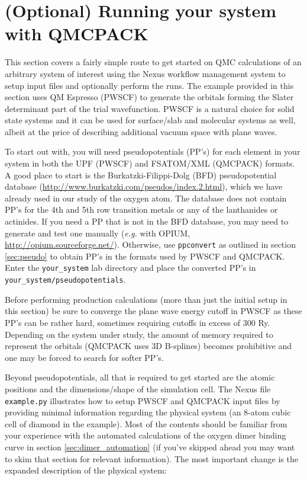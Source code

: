 \section{(Optional) Running your system with QMCPACK}\label{sec:your_system}
This section covers a fairly simple route to get started on QMC calculations of an arbitrary system of interest using the Nexus workflow management system to setup input files and optionally perform the runs.  The example provided in this section uses QM Espresso (PWSCF) to generate the orbitals forming the Slater determinant part of the trial wavefunction.  PWSCF is a natural choice for solid state systems and it can be used for surface/slab and molecular systems as well, albeit at the price of describing additional vacuum space with plane waves.

To start out with, you will need pseudopotentials (PP's) for each element in your system in both the UPF (PWSCF) and FSATOM/XML (QMCPACK) formats.  A good place to start is the Burkatzki-Filippi-Dolg (BFD) pseudopotential database \newline (\href{http://www.burkatzki.com/pseudos/index.2.html}{http://www.burkatzki.com/pseudos/index.2.html}), which we have already used in our study of the oxygen atom.  The database does not contain PP's for the 4th and 5th row transition metals or any of the lanthanides or actinides.  If you need a PP that is not in the BFD database, you may need to generate and test one manually (\emph{e.g.} with OPIUM, \href{http://opium.sourceforge.net/}{http://opium.sourceforge.net/}).  Otherwise, use \texttt{ppconvert} as outlined in section \ref{sec:pseudo} to obtain PP's in the formats used by PWSCF and QMCPACK.  Enter the \texttt{your\_system} lab directory and place the converted PP's in \texttt{your\_system/pseudopotentials}.

Before performing production calculations (more than just the initial setup in this section) be sure to converge the plane wave energy cutoff in PWSCF as these PP's can be rather hard, sometimes requiring cutoffs in excess of 300 Ry.  Depending on the system under study, the amount of memory required to represent the orbitals (QMCPACK uses 3D B-splines) becomes prohibitive and one may be forced to search for softer PP's.

Beyond pseudopotentials, all that is required to get started are the atomic positions and the dimensions/shape of the simulation cell.  The Nexus file \texttt{example.py} illustrates how to setup PWSCF and QMCPACK input files by providing minimal information regarding the physical system (an 8-atom cubic cell of diamond in the example).  Most of the contents should be familiar from your experience with the automated calculations of the oxygen dimer binding curve in section \ref{sec:dimer_automation} (if you've skipped ahead you may want to skim that section for relevant information).  The most important change is the expanded description of the physical system:

